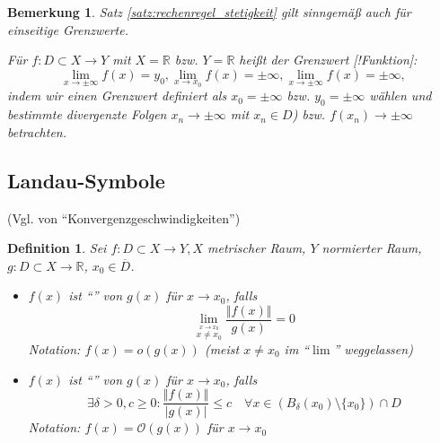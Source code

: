 \documentclass[ngerman,a4paper]{report}
\theoremstyle{break}
\newtheorem*{definition}{Definition}
\newtheorem{remark}[theorem]{Bemerkung}
\begin{document}
\begin{remark}
	Satz \ref{satz:rechenregel_stetigkeit} gilt sinngemäß auch für einseitige Grenzwerte.
	
	Für $f:D\subset X\to Y$ mit $X=\mathbb{R}$ bzw. $Y=\mathbb{R}$ heißt der Grenzwert [!Funktion]: \[\lim\limits_{x\to \pm \infty} f(x) = y_0, \lim\limits_{x\rightarrow x_0} f(x) = \pm \infty, \lim\limits_{x\to \pm \infty} f(x) = \pm \infty,\] indem wir einen Grenzwert definiert als $x_0=\pm \infty$ bzw. $y_0=\pm\infty$ wählen und bestimmte divergenzte Folgen $x_n\to \pm \infty$ mit $x_n\in D$) bzw. $f(x_n)\to \pm \infty$ betrachten.
\end{remark}
\subsection*{Landau-Symbole} (Vgl. von "`Konvergenzgeschwindigkeiten"')
\begin{definition}
	Sei $f:D\subset X\to Y, X$ metrischer Raum, $Y$ normierter Raum, $g:D\subset X\to \mathbb{R}$, $x_0\in \overline{D}$.
	\begin{itemize}
		\item $f(x)$ ist "`"' von $g(x)$ für $x\to x_0$, falls \[ \lim\limits_{\stackrel{x\to x_0}{x\neq x_0}} \frac{\Vert f(x)\Vert}{g(x)} = 0 \]
		Notation: $f(x) = o(g(x))$ (meist $x\neq x_0$ im "`$\lim$"' weggelassen)
		\item $f(x)$ ist "`"' von $g(x)$ für $x\to x_0$, falls \[ \exists \delta > 0, c \ge 0: \frac{\Vert f(x)\Vert}{|g(x)|} \le c \quad \forall x\in (B_\delta(x_0) \setminus \{x_0\})\cap D \]
		Notation: $f(x) = \mathcal{O}(g(x))$ für $x\to x_0$
	\end{itemize}
\end{definition}
\end{document}
